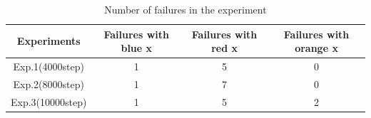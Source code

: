 \begin{table}[h]
  \centering
  \begin{tabular}{|c|c|c|c|} \hline
    Experiments & Failures with blue x & Failures with red x & Failures with orange x\\ \hline
    Exp.1(4000step) & 1 & 5 & 0 \\ \hline
    Exp.2(8000step) & 1 & 7 & 0 \\ \hline
    Exp.3(10000step) & 1 & 5 & 2 \\ \hline
  \end{tabular}
  \caption{Number of failures in the experiment}
  \label{tb:fail1.2}
\end{table}






